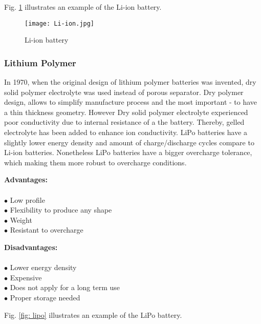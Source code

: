 Fig. \ref{fig: lion} illustrates an example of the Li-ion battery. 

\begin{figure}[h]
	\centering
	\texttt{[image: Li-ion.jpg]}
	\caption{ Li-ion battery \cite{11}}
	\label{fig: lion}
\end{figure}

\subsubsection{Lithium Polymer \label{sec:tech}}

In 1970, when the original design of lithium polymer batteries was invented, dry solid polymer electrolyte was used instead of  porous separator. Dry polymer design, allows to simplify manufacture process and the most important - to have a thin thickness geometry. However Dry solid polymer electrolyte experienced poor conductivity due to internal resistance of a the battery. Thereby, gelled electrolyte has been added to enhance ion conductivity. LiPo batteries have a slightly lower energy density and amount of charge/discharge cycles compare to Li-ion batteries. Nonetheless LiPo batteries have a bigger overcharge tolerance, which making them more robust to overcharge conditions.


\begin{multicols}{2}
	
	\textbf{Advantages:} \\ \\
	$\bullet$ Low profile \\
	$\bullet$ Flexibility to produce any shape\\
	$\bullet$ Weight\\
	$\bullet$ Resistant to overcharge\\
	
	
	
	
	\columnbreak
	
	\textbf{Disadvantages:} \\ \\
	$\bullet$ Lower energy density\\
	$\bullet$ Expensive\\
	$\bullet$ Does not apply for a long term use\\
	$\bullet$ Proper storage needed 
	
	
	
\end{multicols}

Fig. \ref{fig: lipo} illustrates an example of the LiPo battery. 


